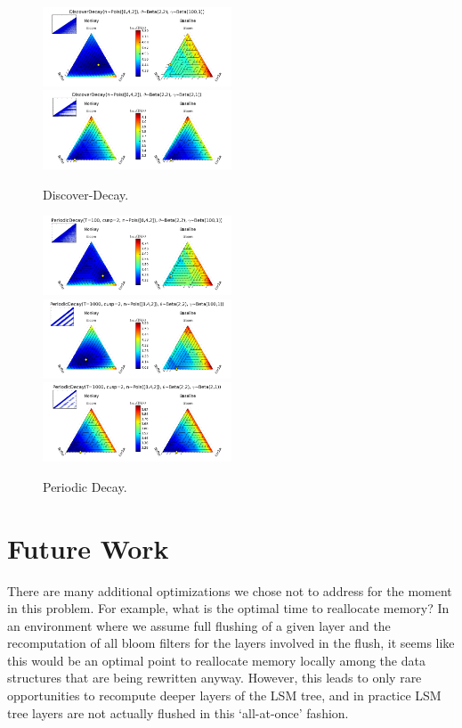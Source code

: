 \documentclass{sig-alternate-05-2015}
\begin{document}
\begin{figure}[!htb]
\begin{center}
\includegraphics[width=0.5\textwidth]{discdecquiv1.png}
\includegraphics[width=0.5\textwidth]{discdecquiv2.png}
\end{center}
\caption{Discover-Decay.}
\label{fig:discdecquiv}
\end{figure}

\begin{figure}[!htb]
\begin{center}
\includegraphics[width=0.5\textwidth]{periodquiv1.png}
\includegraphics[width=0.5\textwidth]{periodquiv2.png}
\includegraphics[width=0.5\textwidth]{periodquiv3.png}
\end{center}
\caption{Periodic Decay.}
\label{fig:periodquiv}
\end{figure}


\section{Future Work}
There are many additional optimizations we chose not to address for the moment in this problem. For example, what is the optimal time to reallocate memory? In an environment where we assume full flushing of a given layer and the recomputation of all bloom filters for the layers involved in the flush, it seems like this would be an optimal point to reallocate memory locally among the data structures that are being rewritten anyway. However, this leads to only rare opportunities to recompute deeper layers of the LSM tree, and in practice LSM tree layers are not actually flushed in this `all-at-once' fashion. 
\end{document}
